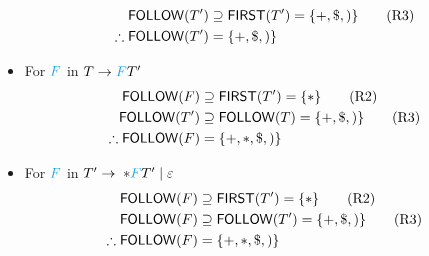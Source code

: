\documentclass[10pt,a4paper,landscape]{article}
\begin{document}
\begin{multicols*}{3}
\begin{itemize}
  \begin{align*}
    \mathsf{FOLLOW}(T') &\supseteq \mathsf{FIRST}(T') = \{+, \$, )\} \tag{R3}\\
    \therefore \mathsf{FOLLOW}(T') &= \{+, \$, )\}
  \end{align*}
\item For $\mb{F}$ in $T\to \mb{F}T'$
  \begin{align*}
    \mathsf{FOLLOW}(F) &\supseteq \mathsf{FIRST}(T') = \{*\} \tag{R2} \\
    \mathsf{FOLLOW}(T') &\supseteq \mathsf{FOLLOW}(T) = \{+, \$, )\} \tag{R3} \\
    \therefore \mathsf{FOLLOW}(F) &= \{+, * , \$, )\}
  \end{align*}
\item For $\mb{F}$ in $T'\to\; *\mb{F}T' \gor \varepsilon$
  \begin{align*}
    \mathsf{FOLLOW}(F) &\supseteq \mathsf{FIRST}(T') = \{*\}  \tag{R2} \\
    \mathsf{FOLLOW}(F) &\supseteq \mathsf{FOLLOW}(T') = \{+, \$, )\} \tag{R3} \\
    \therefore \mathsf{FOLLOW}(F) &= \{+, * , \$, )\}
  \end{align*}
\end{itemize}


\end{multicols*}
\end{document}
